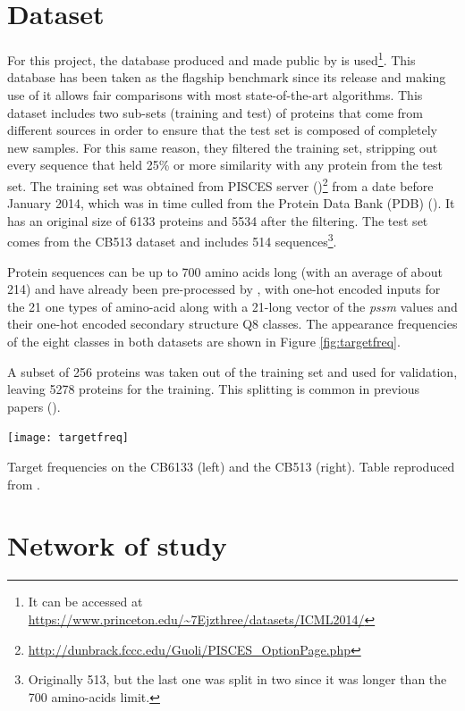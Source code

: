 \section{Dataset}
For this project, the database produced and made public by \cite{Zhou2014} is used\footnote{It can be accessed at \url{https://www.princeton.edu/\~7Ejzthree/datasets/ICML2014/}}. This database has been taken as the flagship benchmark since its release and making use of it allows fair comparisons with most state-of-the-art algorithms. This dataset includes two sub-sets (training and test) of proteins that come from different sources in order to ensure that the test set is composed of completely new samples. For this same reason, they filtered the training set, stripping out every sequence that held 25\% or more similarity with any protein from the test set.
The training set was obtained from PISCES server (\cite{Wang2003})\footnote{\url{http://dunbrack.fccc.edu/Guoli/PISCES\_OptionPage.php}} from a date before January 2014, which was in time culled from the Protein Data Bank (PDB) (\cite{Berman2003}).
It has an original size of 6133 proteins and 5534 after the filtering. The test set comes from the CB513 dataset \cite{Cuff1999} and includes 514 sequences\footnote{Originally 513, but the last one was split in two since it was longer than the 700 amino-acids limit.}.

Protein sequences can be up to 700 amino acids long (with an average of about 214) and have already been pre-processed by \cite{Zhou2014}, with one-hot encoded inputs for the 21 one types of amino-acid along with a 21-long vector of the \textit{pssm} values and their one-hot encoded secondary structure Q8 classes. The appearance frequencies of the eight classes in both datasets are shown in Figure \ref{fig:targetfreq}.

A subset of 256 proteins was taken out of the training set and used for validation, leaving 5278 proteins for the training. This splitting is common in previous papers (\cite{Zhou2014,Sønderby2014,Busia2017,Jurtz2017,Hattori2017}).

\begin{table}[h]
	\centering
	\texttt{[image: targetfreq]}
	\caption{Target frequencies on the CB6133 (left) and the CB513 (right). Table reproduced from \cite{Hattori2017}.}
	\label{fig:targetfreq}
\end{table}


\section{Network of study}\label{sect:network}

